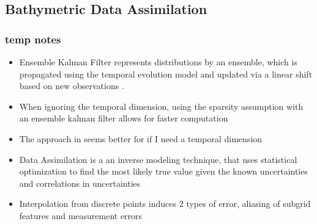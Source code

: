 \restoregeometry

\subsection{Bathymetric Data Assimilation}

\subsubsection*{temp notes}
\begin{itemize}
      \color{blue}
      \item Ensemble Kalman Filter represents distributions by an ensemble, which is propagated using the temporal evolution model and updated via a linear shift based on new observations \parencite{Jurek2021}.
      \item When ignoring the temporal dimension, using the sparsity assumption with an ensemble kalman filter allows for faster computation \parencite{Jurek2021}
      \item The approach in \citeauthor{Jurek2021} seems better for if I need a temporal dimension 
      \item Data Assimilation is a an inverse modeling technique, that uses statistical optimization to find the most likely true value given the known uncertainties and correlations in uncertainties \parencite{Salim2021}
      \item Interpolation from discrete points induces 2 types of error, aliasing of subgrid features and measurement errors \parencite{Plant2002}
   

\end{itemize}
